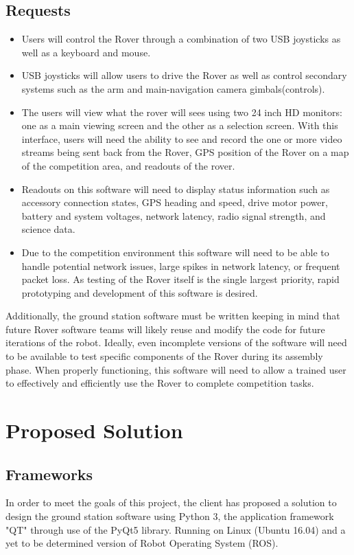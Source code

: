 \documentclass[onecolumn, draftclsnofoot, 10pt, compsoc]{IEEEtran}
\begin{document}
\subsection{Requests}
\begin{itemize}
\item Users will control the Rover through a combination of two USB joysticks as well as a keyboard and mouse.
\item USB joysticks will allow users to drive the Rover as well as control secondary systems such as the arm and main-navigation camera gimbals(controls). 
\item The users will view what the rover will sees using two 24 inch HD monitors: one as a main viewing screen and the other as a selection screen. 
With this interface, users will need the ability to see and record
the one or more video streams being sent back from the Rover, GPS position of the Rover on a map of the competition area, and readouts of the rover.
\item Readouts on this software will need to display status information such as accessory connection states, GPS heading and speed, drive motor power, battery and system voltages, network latency, radio signal strength, and science data. 
\item Due to the competition environment this software will need to be able to handle potential network issues, large spikes in network latency, or frequent packet loss. 
As testing of the Rover itself is the single largest priority, rapid prototyping and development of this software is desired.
\end{itemize}
Additionally, the ground station software must be written keeping in mind that future Rover software teams will likely reuse and modify the code for future iterations of the robot.
Ideally, even incomplete versions of the software will need to be available to test specific components of the Rover during its assembly phase. 
When properly functioning, this software will need to allow a trained user to effectively and efficiently use the Rover to complete competition tasks.


\section{Proposed Solution}
\subsection{Frameworks}
In order to meet the goals of this project, the client has proposed a solution to design the ground station software using Python 3, the application framework "QT" through use of the PyQt5 library. Running on Linux (Ubuntu 16.04) and a yet to be determined version of Robot Operating System (ROS).
\end{document}
